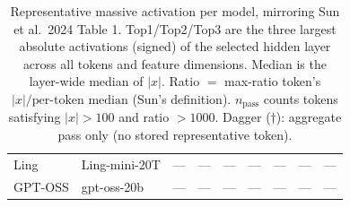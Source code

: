 \begin{table}[t]
\begin{tabular}{llcrrrrrr}
Ling & Ling-mini-20T & --- & --- & --- & --- & --- & --- & --- \\
GPT-OSS & gpt-oss-20b & --- & --- & --- & --- & --- & --- & --- \\
\bottomrule
\end{tabular}
\caption{Representative massive activation per model, mirroring Sun et al.\ 2024 Table 1. Top1/Top2/Top3 are the three largest absolute activations (signed) of the selected hidden layer across all tokens and feature dimensions. Median is the layer-wide median of $|x|$. Ratio $=$ max-ratio token's $|x|/\text{per-token median}$ (Sun's definition). $n_{\text{pass}}$ counts tokens satisfying $|x|>100$ and ratio $>1000$. Dagger ($\dagger$): aggregate pass only (no stored representative token).}
\label{tab:massive-representative}
\end{table}
